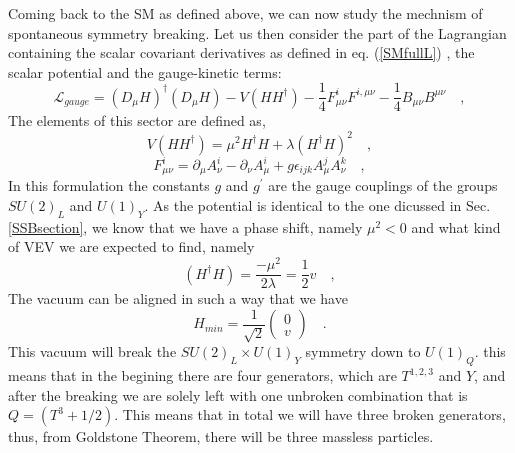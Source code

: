 
Coming back to the SM as defined above, we can now study the mechnism of spontaneous symmetry breaking. Let us then consider the part of the Lagrangian containing the scalar covariant derivatives as defined in eq. (\ref{SMfullL}) , the scalar potential and the gauge-kinetic terms:
%
\begin{equation}
\mathcal{L}_{gauge} = (D_\mu H)^\dagger (D_\mu H) - V (H H^\dagger) - \frac{1}{4} F^i_{\mu \nu} F^{i , \mu \nu} - \frac{1}{4} B_{\mu \nu} B^{\mu \nu} \quad , 
\label{iamgarbagemanyes}
\end{equation} 
The elements of this sector are defined as,
\begin{equation}
V(H H^\dagger ) = \mu^2 H^\dagger H + \lambda (H^\dagger H)^2 \quad , 
\end{equation}
\begin{equation}
 F^i_{\mu \nu}= \partial_\mu A^i_\nu - \partial_\nu A^i_\mu + g \epsilon_{ijk} A^j_\mu A^k_\nu  \quad , 
\end{equation}
%
In this formulation the constants $g$ and $g^\prime$ are the gauge couplings of the groups $SU(2)_L$ and $U(1)_Y$. 
% 
As the potential is identical to the one dicussed in Sec. \ref{SSBsection}, we know that we have a phase shift, namely $\mu^2 < 0$ and what kind of VEV we are expected to find, namely
%
\begin{equation}
(H^\dagger H) = \frac{-\mu^2}{2\lambda} = \frac{1}{2} v  \quad , 
\end{equation} 
%
The vacuum can be aligned in such a way that we have
\begin{equation}
H_{min} = \frac{1}{\sqrt{2}} \begin{pmatrix} 0 \\
v 
\end{pmatrix} \quad .
\end{equation}
This vacuum will break the $SU(2)_L \times U(1)_Y$ symmetry down to $U(1)_Q$. this means that in the begining there are four generators, which are $T^{1,2,3}$ and $Y$, and after the breaking we are solely left with one unbroken combination that is $Q =  (T^3 + 1/2)$. This means that in total we will have three broken generators, thus, from Goldstone Theorem, there will be three massless particles. 

